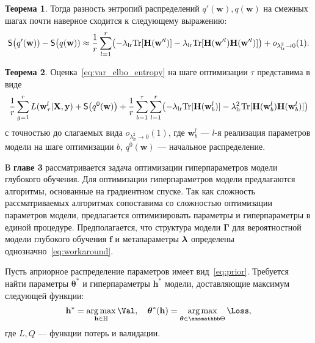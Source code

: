 \documentclass[11pt, a5paper]{dissert}
\theoremstyle{definition}
\newtheorem{theorem}{Теорема}
\DeclareMathOperator*{\argmax}{arg\,max}
\begin{document}
{\begin{theorem}
Тогда разность энтропий распределений $q'(\mathbf{w}), q(\mathbf{w})$ на смежных шагах почти наверное сходится к следующему выражению: 
\begin{equation}
\label{eq:entropy}
	\mathsf{S}\bigl(q'(\mathbf{w})) -  \mathsf{S}\bigl(q(\mathbf{w}))  \approx  \frac{1}{r}\sum_{l=1}^r \bigl(-\lambda_{\text{lr}} \textnormal{Tr}[\mathbf{H}(\mathbf{w}'^l)] - \lambda_{\text{lr}} \textnormal{Tr}[\mathbf{H}(\mathbf{w}'^l)\mathbf{H}(\mathbf{w}'^l)]  \bigr) + o_{\lambda_{\text{lr}}^2 \to 0}(1).
\end{equation}
\end{theorem}


\begin{theorem}\label{st:st2}
Оценка~\eqref{eq:var_elbo_entropy} на шаге оптимизации $\tau$ представима в виде
\begin{equation}
\label{eq:ev_grad_full}
 \frac{1}{r} \sum_{g = 1}^r L(\mathbf{w}^l_\tau| \mathbf{X}, \mathbf{y})  + \mathsf{S}\big(q^0(\mathbf{w})\bigr) + \frac{1}{r}\sum_{b=1}^\tau\sum_{l=1}^r \bigl(-\lambda_{\text{lr}} \textnormal{Tr}[\mathbf{H}(\mathbf{w}_b^l)] - \lambda_{\text{lr}}^2 \textnormal{Tr}[\mathbf{H}(\mathbf{w}_b^l)\mathbf{H}(\mathbf{w}_b^l)]  \bigr) 
\end{equation}
с точностью до слагаемых вида $o_{\lambda_{\text{lr}}^2 \to 0}(1)$,
где $\mathbf{w}_b^l$ --- $l$-я реализация параметров модели на шаге оптимизации $b$, $q^0(\mathbf{w})$ --- начальное распределение.
\end{theorem}

В \textbf{главе 3} рассматривается задача оптимизации гиперпараметров модели глубокого обучения. Для оптимизации гиперпараметров модели предлагаются алгоритмы, основанные на градиентном спуске. Так как сложность рассматриваемых алгоритмах сопоставима со сложностью оптимизации параметров модели, предлагается оптимизировать параметры и гиперпараметры в единой процедуре. Предполагается, что структура модели $\boldsymbol{\Gamma}$ для вероятностной модели глубокого обучения $\mathbf{f}$ и метапараметры $\boldsymbol{\lambda}$ определены однозначно~\eqref{eq:workaround}.

Пусть априорное распределение параметров имеет вид~\eqref{eq:prior}. Требуется найти параметры ${\boldsymbol{\theta}}^{*}$ и гиперпараметры $\mathbf{h}^{*}$ модели, доставляющие максимум следующей функции:
\begin{equation}
\label{eq:main}
    \mathbf{h}^{*} = \argmax_{\mathbf{h} \in \mathbb{H}} \Val, \quad \boldsymbol{\theta}^{*}(\mathbf{h}) =  \argmax_{\boldsymbol{\theta} \in \Tetab} \Loss,
\end{equation}
где $L,Q$ --- функции потерь и валидации.

}
\end{document}
